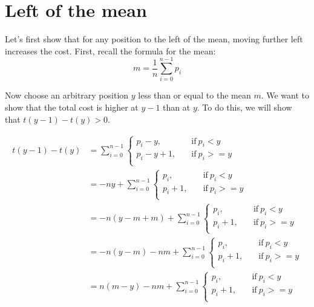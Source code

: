 \documentclass{article}
\begin{document}
\section{Left of the mean}

Let's first show that for any position to the left of the mean,
moving further left increases the cost. First, recall the formula
for the mean:
%
\begin{equation}\label{eq:mean}
  m = \frac{1}{n} \sum_{i=0}^{n-1} p_i
\end{equation}

Now choose an arbitrary position $y$ less than or equal to the mean $m$.
We want to show that the total cost is higher at $y-1$ than at $y$.
To do this, we will show that $t(y-1)-t(y) > 0$.

\begin{equation*}
  \begin{split}
    t(y-1)-t(y) &= \sum_{i=0}^{n-1}
    \begin{cases}
      p_i - y, & \quad\text{if}\ p_i < y \\
      p_i - y + 1, & \quad\text{if}\ p_i >= y \\
    \end{cases} \\
    &= -ny + \sum_{i=0}^{n-1}
    \begin{cases}
      p_i, & \quad\text{if}\ p_i < y \\
      p_i + 1, & \quad\text{if}\ p_i >= y \\
    \end{cases} \\
    &= -n(y-m+m) + \sum_{i=0}^{n-1}
    \begin{cases}
      p_i, & \quad\text{if}\ p_i < y \\
      p_i + 1, & \quad\text{if}\ p_i >= y \\
    \end{cases} \\
    &= -n(y-m) -nm + \sum_{i=0}^{n-1}
    \begin{cases}
      p_i, & \quad\text{if}\ p_i < y \\
      p_i + 1, & \quad\text{if}\ p_i >= y \\
    \end{cases} \\
    &= n(m-y) -nm + \sum_{i=0}^{n-1}
    \begin{cases}
      p_i, & \quad\text{if}\ p_i < y \\
      p_i + 1, & \quad\text{if}\ p_i >= y \\

\end{cases}
\end{split}
\end{equation*}
\end{document}
